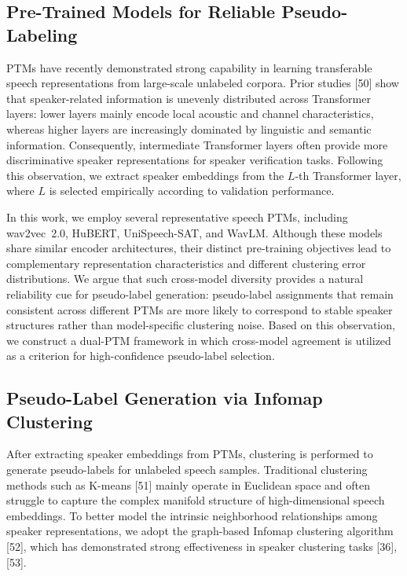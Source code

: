 \documentclass[lettersize,journal]{IEEEtran}
\begin{document}
\subsection{Pre-Trained Models for Reliable Pseudo-Labeling}

PTMs have recently demonstrated strong capability in learning transferable speech representations from large-scale unlabeled corpora. Prior studies [50] show that speaker-related information is unevenly distributed across Transformer layers: lower layers mainly encode local acoustic and channel characteristics, whereas higher layers are increasingly dominated by linguistic and semantic information. Consequently, intermediate Transformer layers often provide more discriminative speaker representations for speaker verification tasks. Following this observation, we extract speaker embeddings from the $L$-th Transformer layer, where $L$ is selected empirically according to validation performance.

In this work, we employ several representative speech PTMs, including wav2vec~2.0, HuBERT, UniSpeech-SAT, and WavLM. Although these models share similar encoder architectures, their distinct pre-training objectives lead to complementary representation characteristics and different clustering error distributions. We argue that such cross-model diversity provides a natural reliability cue for pseudo-label generation: pseudo-label assignments that remain consistent across different PTMs are more likely to correspond to stable speaker structures rather than model-specific clustering noise. Based on this observation, we construct a dual-PTM framework in which cross-model agreement is utilized as a criterion for high-confidence pseudo-label selection.

\subsection{Pseudo-Label Generation via Infomap Clustering}

After extracting speaker embeddings from PTMs, clustering is performed to generate pseudo-labels for unlabeled speech samples. Traditional clustering methods such as K-means [51] mainly operate in Euclidean space and often struggle to capture the complex manifold structure of high-dimensional speech embeddings. To better model the intrinsic neighborhood relationships among speaker representations, we adopt the graph-based Infomap clustering algorithm [52], which has demonstrated strong effectiveness in speaker clustering tasks [36], [53].
\end{document}
